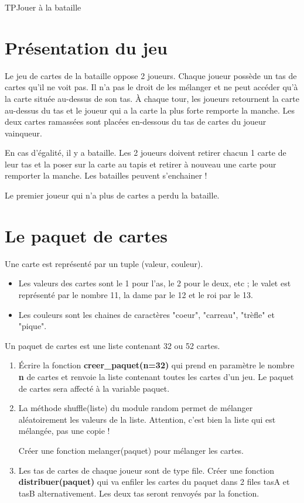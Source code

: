 \documentclass[11pt,a4paper]{article}
\begin{document}
\begin{NSI}
{TP}{Jouer à la bataille}
\end{NSI}


\section{Présentation du jeu}

Le jeu de cartes de la bataille oppose 2 joueurs. Chaque joueur possède un tas de cartes qu'il ne voit pas. Il n'a pas le droit de les mélanger et ne peut accéder qu'à la carte située au-dessus de son tas. À chaque tour, les joueurs retournent la carte au-dessus du tas et le joueur qui a la carte la plus forte remporte la manche. Les deux cartes ramassées sont placées en-dessous du tas de cartes du joueur vainqueur. \medskip

En cas d'égalité, il y a bataille. Les 2 joueurs doivent retirer chacun 1 carte de leur tas et la poser sur la carte au tapis et retirer à nouveau une carte pour remporter la manche. Les batailles peuvent s'enchainer !

Le premier joueur qui n'a plus de cartes a perdu la bataille.

\section{Le paquet de cartes}

Une carte est représenté par un tuple (valeur, couleur).

\begin{itemize}
\item Les valeurs des cartes sont le 1 pour l'as, le 2 pour le deux, etc ; le valet est représenté par le nombre 11, la dame par le 12 et le roi par le 13.
\item Les couleurs sont les chaines de caractères "coeur", "carreau", "trèfle" et "pique".
\end{itemize}

Un paquet de cartes est une liste contenant 32 ou 52 cartes.


\begin{enumerate}

\item Écrire la fonction \textbf{creer\_paquet(n=32)} qui prend en paramètre le nombre \textbf{n} de cartes et renvoie la liste contenant toutes les cartes d'un jeu. Le paquet de cartes sera affecté à la variable \textsf{paquet}.

\item La méthode \textsf{shuffle}(liste) du module \textsf{random} permet de mélanger aléatoirement les valeurs de la liste. Attention, c'est bien la liste qui est mélangée, pas une copie !

Créer une fonction melanger(paquet) pour mélanger les cartes.

\item Les tas de cartes de chaque joueur sont de type \textsf{file}. Créer une fonction \textbf{distribuer(paquet)} qui va enfiler les cartes du paquet dans 2 files tasA et tasB alternativement. Les deux tas seront renvoyés par la fonction.
\end{enumerate}
\end{document}
